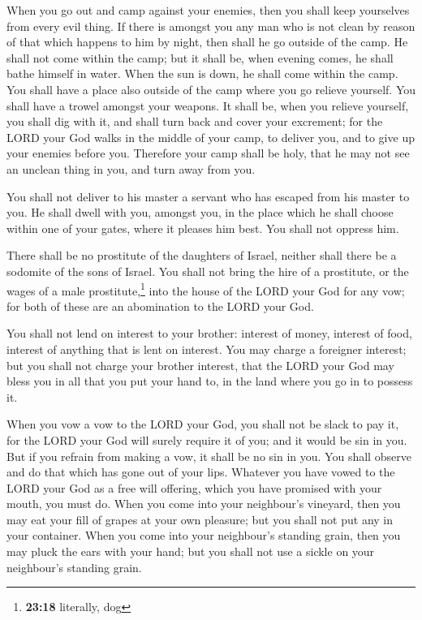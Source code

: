  When you go out and camp against your enemies, then you
shall keep yourselves from every evil thing.  If there is
amongst you any man who is not clean by reason of that which happens to
him by night, then shall he go outside of the camp. He shall not come
within the camp;  but it shall be, when evening comes, he
shall bathe himself in water. When the sun is down, he shall come within
the camp.  You shall have a place also outside of the
camp where you go relieve yourself.  You shall have a
trowel amongst your weapons. It shall be, when you relieve yourself, you
shall dig with it, and shall turn back and cover your excrement;
 for the LORD your God walks in the middle of your camp,
to deliver you, and to give up your enemies before you. Therefore your
camp shall be holy, that he may not see an unclean thing in you, and
turn away from you.

 You shall not deliver to his master a servant who has
escaped from his master to you.  He shall dwell with you,
amongst you, in the place which he shall choose within one of your
gates, where it pleases him best. You shall not oppress him.

 There shall be no prostitute of the daughters of Israel,
neither shall there be a sodomite of the sons of Israel. 
You shall not bring the hire of a prostitute, or the wages of a male
prostitute,\footnote{\textbf{23:18} literally, dog} into the house of
the LORD your God for any vow; for both of these are an abomination to
the LORD your God.

 You shall not lend on interest to your brother: interest
of money, interest of food, interest of anything that is lent on
interest.  You may charge a foreigner interest; but you
shall not charge your brother interest, that the LORD your God may bless
you in all that you put your hand to, in the land where you go in to
possess it.

 When you vow a vow to the LORD your God, you shall not
be slack to pay it, for the LORD your God will surely require it of you;
and it would be sin in you.  But if you refrain from
making a vow, it shall be no sin in you.  You shall
observe and do that which has gone out of your lips. Whatever you have
vowed to the LORD your God as a free will offering, which you have
promised with your mouth, you must do.  When you come
into your neighbour's vineyard, then you may eat your fill of grapes at
your own pleasure; but you shall not put any in your container.
 When you come into your neighbour's standing grain, then
you may pluck the ears with your hand; but you shall not use a sickle on
your neighbour's standing grain.

